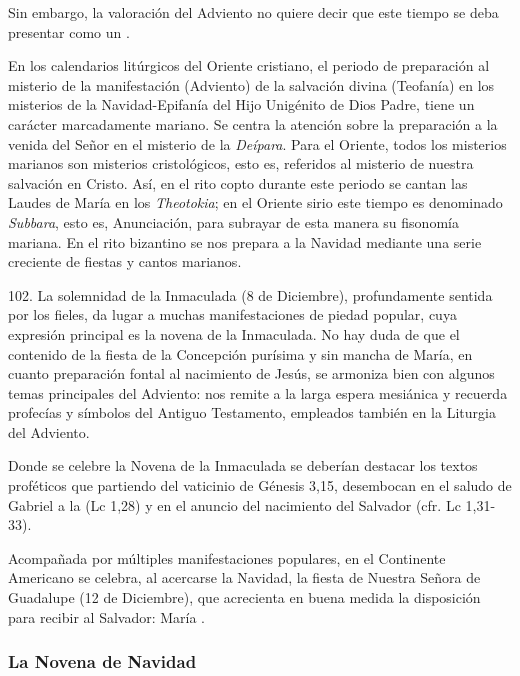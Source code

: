 \begin{introstyle}
	Sin embargo, la valoración del Adviento  no quiere decir que este tiempo se deba presentar como un .
	
	En los calendarios litúrgicos del Oriente cristiano, el periodo de preparación al misterio de la manifestación (Adviento) de la salvación	divina (Teofanía) en los misterios de la Navidad-Epifanía del Hijo Unigénito de Dios Padre, tiene un carácter marcadamente mariano. Se
	centra la atención sobre la preparación a la venida del Señor en el	misterio de la \emph{Deípara}. Para el Oriente, todos los misterios marianos son misterios cristológicos, esto es, referidos al misterio de nuestra salvación en Cristo. Así, en el rito copto durante este periodo se cantan las Laudes de María en los \emph{Theotokia}; en el Oriente sirio este tiempo es denominado \emph{Subbara}, esto es, Anunciación, para subrayar de esta manera su fisonomía mariana. En el rito bizantino	se nos prepara a la Navidad mediante una serie creciente de fiestas y cantos marianos.
	
	102. La solemnidad de la Inmaculada (8 de Diciembre), profundamente	sentida por los fieles, da lugar a muchas manifestaciones de piedad popular, cuya expresión principal es la novena de la Inmaculada. No hay duda de que el contenido de la fiesta de la Concepción purísima y sin mancha de María, en cuanto preparación fontal al nacimiento de Jesús, se armoniza bien con algunos temas principales del Adviento: nos remite a la larga espera mesiánica y recuerda profecías y símbolos del Antiguo Testamento, empleados también en la Liturgia del Adviento.
	
	Donde se celebre la Novena de la Inmaculada se deberían destacar los textos proféticos que partiendo del vaticinio de Génesis 3,15, desembocan en el saludo de Gabriel a la  (Lc 1,28) y	en el anuncio del nacimiento del Salvador (cfr. Lc 1,31-33).
	
	Acompañada por múltiples manifestaciones populares, en el Continente Americano se celebra, al acercarse la Navidad, la fiesta de Nuestra Señora de Guadalupe (12 de Diciembre), que acrecienta en buena medida la disposición para recibir al Salvador: María .
	
	
	\subsubsection{La Novena de Navidad}
	

\end{introstyle}
